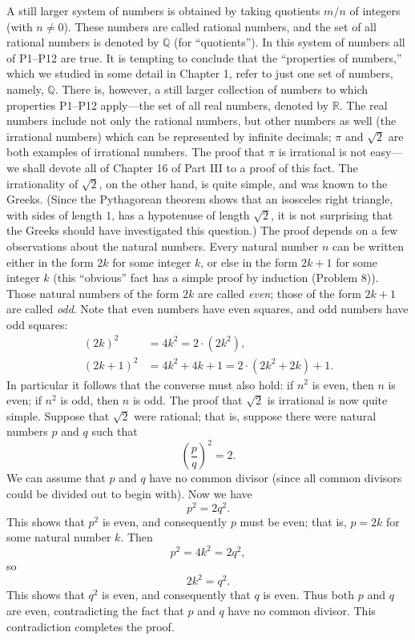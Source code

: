 A still larger system of numbers is obtained by taking quotients $m/n$ of
integers (with $n \neq 0$). These numbers are called rational numbers, and the
set of all rational numbers is denoted by $\mathbb{Q}$ (for ``quotients''). In
this system of numbers all of P1--P12 are true. It is tempting to conclude
that the ``properties of numbers,'' which we studied in some detail in
Chapter 1, refer to just one set of numbers, namely, $\mathbb{Q}$. There is,
however, a still larger collection of numbers to which properties P1--P12
apply---the set of all real numbers, denoted by $\mathbb{R}$. The real numbers
include not only the rational numbers, but other numbers as well (the
irrational numbers) which can be represented by infinite decimals; $\pi$ and
$\sqrt{2}$ are both examples of irrational numbers. The proof that $\pi$ is
irrational is not easy---we shall devote all of Chapter 16 of Part III to a
proof of this fact. The irrationality of $\sqrt{2}$, on the other hand, is
quite simple, and was known to the Greeks. (Since the Pythagorean theorem
shows that an isosceles right triangle, with sides of length $1$, has a
hypotenuse of length $\sqrt{2}$, it is not surprising that the Greeks should
have investigated this question.) The proof depends on a few observations
about the natural numbers. Every natural number $n$ can be written either in
the form $2k$ for some integer $k$, or else in the form $2k + 1$ for some
integer $k$ (this ``obvious'' fact has a simple proof by induction
(Problem 8)). Those natural numbers of the form $2k$ are called \emph{even};
those of the form $2k+1$ are called \emph{odd}. Note that even numbers have
even squares, and odd numbers have odd squares:
\begin{align*}
(2k)^2 &= 4k^2 = 2 \cdot (2k^2),\\
(2k+1)^2 &= 4k^2 + 4k + 1 = 2 \cdot (2k^2 + 2k) + 1.
\end{align*}
In particular it follows that the converse must also hold: if $n^2$ is even,
then $n$ is even; if $n^2$ is odd, then $n$ is odd. The proof that $\sqrt{2}$
is irrational is now quite simple. Suppose that $\sqrt{2}$ were rational; that
is, suppose there were natural numbers $p$ and $q$ such that
\[ \left(\frac{p}{q}\right)^2 = 2. \]
We can assume that $p$ and $q$ have no common divisor (since all common
divisors could be divided out to begin with). Now we have
\[ p^2 = 2q^2. \]
This shows that $p^2$ is even, and consequently $p$ must be even; that is,
$p = 2k$ for some natural number $k$. Then
\[ p^2 = 4k^2 = 2q^2, \]
so
\[ 2k^2 = q^2. \]
This shows that $q^2$ is even, and consequently that $q$ is even. Thus both
$p$ and $q$ are even, contradicting the fact that $p$ and $q$ have no common
divisor. This contradiction completes the proof.

